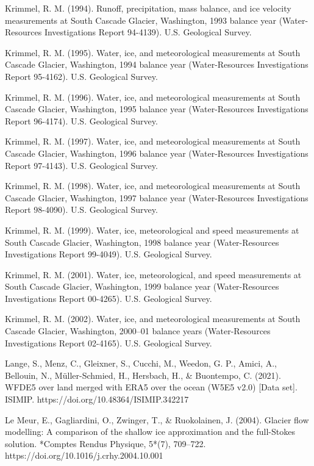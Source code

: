 \documentclass{article}
\begin{document}
\begin{thebibliography}{}
    Krimmel, R. M. (1994). Runoff, precipitation, mass balance, and ice velocity measurements at South Cascade Glacier, Washington, 1993 balance year (Water-Resources Investigations Report 94-4139). U.S. Geological Survey.

    Krimmel, R. M. (1995). Water, ice, and meteorological measurements at South Cascade Glacier, Washington, 1994 balance year (Water-Resources Investigations Report 95-4162). U.S. Geological Survey.

    Krimmel, R. M. (1996). Water, ice, and meteorological measurements at South Cascade Glacier, Washington, 1995 balance year (Water-Resources Investigations Report 96-4174). U.S. Geological Survey.

    Krimmel, R. M. (1997). Water, ice, and meteorological measurements at South Cascade Glacier, Washington, 1996 balance year (Water-Resources Investigations Report 97-4143). U.S. Geological Survey.

    Krimmel, R. M. (1998). Water, ice, and meteorological measurements at South Cascade Glacier, Washington, 1997 balance year (Water-Resources Investigations Report 98-4090). U.S. Geological Survey.

    Krimmel, R. M. (1999). Water, ice, meteorological and speed measurements at South Cascade Glacier, Washington, 1998 balance year (Water-Resources Investigations Report 99-4049). U.S. Geological Survey.

    Krimmel, R. M. (2001). Water, ice, meteorological, and speed measurements at South Cascade Glacier, Washington, 1999 balance year (Water-Resources Investigations Report 00-4265). U.S. Geological Survey.

    Krimmel, R. M. (2002). Water, ice, and meteorological measurements at South Cascade Glacier, Washington, 2000–01 balance years (Water-Resources Investigations Report 02-4165). U.S. Geological Survey.

    Lange, S., Menz, C., Gleixner, S., Cucchi, M., Weedon, G. P., Amici, A., Bellouin, N., Müller-Schmied, H., Hersbach, H., \& Buontempo, C. (2021). WFDE5 over land merged with ERA5 over the ocean (W5E5 v2.0) [Data set]. ISIMIP. https://doi.org/10.48364/ISIMIP.342217

    Le Meur, E., Gagliardini, O., Zwinger, T., \& Ruokolainen, J. (2004). Glacier flow modelling: A comparison of the shallow ice approximation and the full-Stokes solution. *Comptes Rendus Physique, 5*(7), 709–722. https://doi.org/10.1016/j.crhy.2004.10.001


\end{thebibliography}
\end{document}
